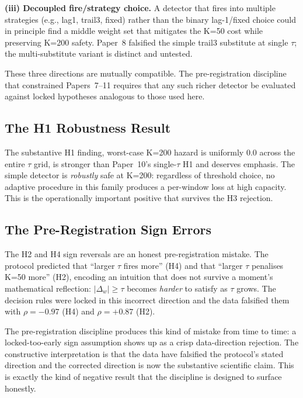 \textbf{(iii) Decoupled fire/strategy choice.} A detector that fires
into multiple strategies (e.g., \textsf{lag1}, \textsf{trail3},
\textsf{fixed}) rather than the binary lag-1/fixed choice could in
principle find a middle weight set that mitigates the K=50 cost
while preserving K=200 safety. Paper~8 falsified the simple trail3
substitute at single $\tau$; the multi-substitute variant is
distinct and untested.

These three directions are mutually compatible. The pre-registration
discipline that constrained Papers~7--11 requires that any such
richer detector be evaluated against locked hypotheses analogous to
those used here.

\subsection{The H1 Robustness Result}

The substantive H1 finding, worst-case K=200 hazard is uniformly
$0.0$ across the entire $\tau$ grid, is stronger than Paper~10's
single-$\tau$ H1 and deserves emphasis. The simple detector is
\textit{robustly} safe at K=200: regardless of threshold choice, no
adaptive procedure in this family produces a per-window loss at high
capacity. This is the operationally important positive that survives
the H3 rejection.

\subsection{The Pre-Registration Sign Errors}

The H2 and H4 sign reversals are an honest pre-registration mistake.
The protocol predicted that ``larger $\tau$ fires more'' (H4) and
that ``larger $\tau$ penalises K=50 more'' (H2), encoding an
intuition that does not survive a moment's mathematical reflection:
$|\Delta_w| \geq \tau$ becomes \textit{harder} to satisfy as $\tau$
grows. The decision rules were locked in this incorrect direction
and the data falsified them with $\rho = -0.97$ (H4) and $\rho =
+0.87$ (H2).

The pre-registration discipline produces this kind of mistake from
time to time: a locked-too-early sign assumption shows up as a
crisp data-direction rejection. The constructive interpretation is
that the data have falsified the protocol's stated direction and
the corrected direction is now the substantive scientific claim.
This is exactly the kind of negative result that the discipline is
designed to surface honestly.

